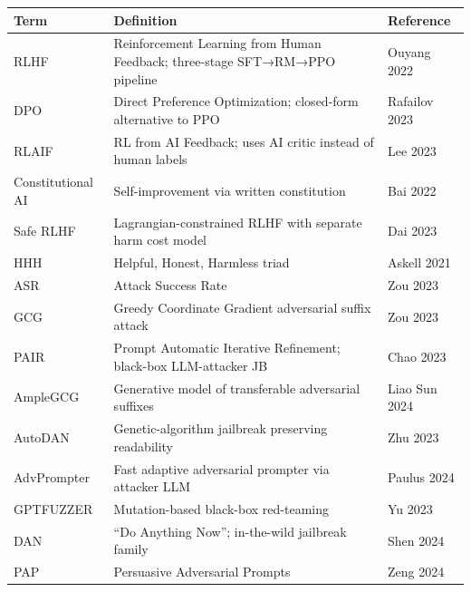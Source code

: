 {\def\LTcaptype{none} %
\begin{longtable}[]{@{}
  >{\raggedright\arraybackslash}p{}
  >{\raggedright\arraybackslash}p{}
  >{\raggedright\arraybackslash}p{}@{}}
\toprule\noalign{}
\begin{minipage}[b]{\linewidth}\raggedright
Term
\end{minipage} & \begin{minipage}[b]{\linewidth}\raggedright
Definition
\end{minipage} & \begin{minipage}[b]{\linewidth}\raggedright
Reference
\end{minipage} \\
\midrule\noalign{}
\endhead
\bottomrule\noalign{}
\endlastfoot
RLHF & Reinforcement Learning from Human Feedback; three-stage SFT→RM→PPO pipeline & Ouyang 2022 \\
DPO & Direct Preference Optimization; closed-form alternative to PPO & Rafailov 2023 \\
RLAIF & RL from AI Feedback; uses AI critic instead of human labels & Lee 2023 \\
Constitutional AI & Self-improvement via written constitution & Bai 2022 \\
Safe RLHF & Lagrangian-constrained RLHF with separate harm cost model & Dai 2023 \\
HHH & Helpful, Honest, Harmless triad & Askell 2021 \\
ASR & Attack Success Rate & Zou 2023 \\
GCG & Greedy Coordinate Gradient adversarial suffix attack & Zou 2023 \\
PAIR & Prompt Automatic Iterative Refinement; black-box LLM-attacker JB & Chao 2023 \\
AmpleGCG & Generative model of transferable adversarial suffixes & Liao Sun 2024 \\
AutoDAN & Genetic-algorithm jailbreak preserving readability & Zhu 2023 \\
AdvPrompter & Fast adaptive adversarial prompter via attacker LLM & Paulus 2024 \\
GPTFUZZER & Mutation-based black-box red-teaming & Yu 2023 \\
DAN & ``Do Anything Now''; in-the-wild jailbreak family & Shen 2024 \\
PAP & Persuasive Adversarial Prompts & Zeng 2024 \\

\end{longtable}}
